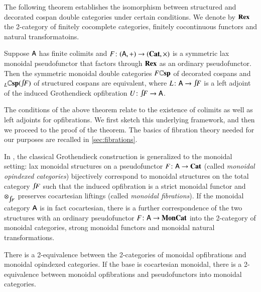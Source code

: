 \documentclass[reqno]{amsart}
\begin{document}
The following theorem establishes the isomorphism between structured and decorated cospan double categories under certain conditions.  We denote by $\mathbf{Rex}$ the 2-category of finitely cocomplete categories, finitely cocontinuous functors and natural transformatoins.

\begin{thm} \label{thm:equiv}
Suppose $\mathsf{A}$ has finite colimits and $F\colon(\mathsf{A},+) \to (\mathbf{Cat},\times)$ is a symmetric lax monoidal pseudofunctor that factors through $\mathbf{Rex}$ as an ordinary pseudofunctor. Then the symmetric monoidal double categories $F\mathbf{\mathbb Csp}$ of decorated cospans and $_L\lCsp(\inta F)$ of structured cospans are equivalent, where $L \maps \A \to \inta F$ is a left adjoint of the induced Grothendieck opfibration $U\maps \inta F \to \A$.
\end{thm}

The conditions of the above theorem relate to the existence of colimits as well as left adjoints for opfibrations. We first sketch this underlying framework, and then we proceed to the proof of the theorem. The basics of fibration theory needed for our purposes are recalled in \cref{sec:fibrations}. 

In \cite{MV}, the classical Grothendieck construction is generalized to the monoidal setting: lax monoidal structures on a pseudofunctor $F\colon\mathsf{A}\to\mathbf{Cat}$ (called \emph{monoidal opindexed categories}) bijectively correspond to monoidal structures on the total category $\inta F$ such that the induced opfibration is a strict monoidal functor and $\otimes_{\inta F}$ preserves cocartesian liftings (called \emph{monoidal fibrations}). If the monoidal category $\mathsf{A}$ is in fact cocartesian, there is a further correspondence of the two structures with an ordinary pseudofunctor $F\colon\mathsf{A}\to\mathbf{MonCat}$ into the 2-category of monoidal categories, strong monoidal functors and monoidal natural transformations.

\begin{lem}\label{lem:MonGroth}
 There is a 2-equivalence between the 2-categories of monoidal opfibrations and monoidal opindexed categories. If the base is cocartesian monoidal, there is a 2-equivalence between monoidal opfibrations and pseudofunctors into monoidal categories. 
\end{lem}
\end{document}
